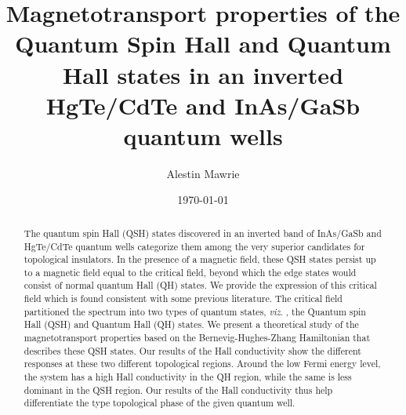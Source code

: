 \documentclass[prb,twocolumn]{revtex4-1}
\begin{document}
	
\title{Magnetotransport properties of the Quantum Spin Hall and Quantum Hall states in an inverted HgTe/CdTe and InAs/GaSb quantum wells
}
\bigskip
\author{Alestin Mawrie}
\normalsize
{}
\date{\today}
\begin{abstract}
	The quantum spin Hall (QSH) states discovered in an inverted band of InAs/GaSb and HgTe/CdTe quantum wells categorize them among the very superior candidates for topological insulators. In the presence of a magnetic field, these QSH states persist up to a magnetic field equal to the critical field, beyond which the edge states would consist of normal quantum Hall (QH) states. We provide the expression of this critical field which is found consistent with some previous literature. The critical field partitioned the spectrum into two types of quantum states, \textit{viz}. , the Quantum spin Hall (QSH) and Quantum Hall (QH) states. We present a theoretical study of the magnetotransport properties based on the Bernevig-Hughes-Zhang Hamiltonian that describes these QSH states. Our results of the Hall conductivity show the different responses at these two different topological regions. Around the low Fermi energy level, the system has a high Hall conductivity in the QH region, while the same is less dominant in the QSH region. Our results of the Hall conductivity thus help differentiate the type topological phase of the given quantum well.
\end{abstract}


\maketitle
\end{document}
